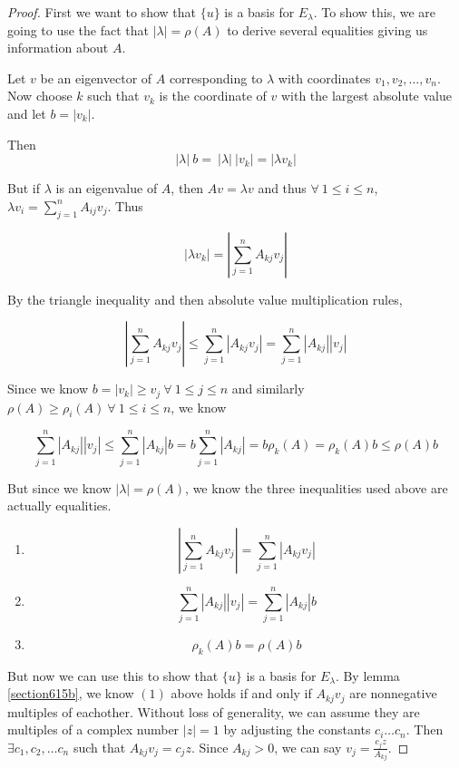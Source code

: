 \documentclass{amsart}
\theoremstyle{definition}
\theoremstyle{remark}
\numberwithin{equation}{section}
\begin{document}
\begin{proof}

First we want to show that $\{ u \}$ is a basis for $E_{\lambda}$.
To show this, we are going to use the fact that $|\lambda| = \rho(A)$ to derive several equalities giving us information about $A$.

Let $v$ be an eigenvector of $A$ corresponding to $\lambda$ with coordinates $v_1, v_2, \ldots, v_n$.  
Now choose $k$ such that $v_k$ is the coordinate of $v$ with the largest absolute value and let $b = |v_k|$.

Then $$ |\lambda|\ b =\ |\lambda|\ |v_k| = |\lambda v_k| $$

But if $\lambda$ is an eigenvalue of $A$, then $Av = \lambda v$ and thus $\forall\ 1 \leq i \leq n$, $\lambda v_i = \sum_{j = 1}^n A_{ij}v_j$.
Thus

$$ |\lambda v_k| = | \sum_{j = 1}^n A_{kj}v_j | $$

By the triangle inequality and then absolute value multiplication rules,

$$ | \sum_{j = 1}^n A_{kj}v_j | \leq \sum_{j=1}^n |A_{kj}v_j| = \sum_{j=1}^n |A_{kj}| |v_j| $$

Since we know $b = |v_k| \geq v_j\ \forall\ 1 \leq j \leq n$ and similarly $\rho(A) \geq  \rho_i(A)\ \forall\ 1 \leq i \leq n $, we know 

$$ \sum_{j=1}^n |A_{kj}| |v_j|  \leq \sum_{j=1}^n |A_{kj}| b = b \sum_{j=1}^n |A_{kj}| =  b\rho_k(A) = \rho_k(A)b \leq \rho(A)b $$


But since we know $|\lambda| = \rho(A)$, we know the three inequalities used above are actually equalities.

\begin{enumerate}

	\item $$| \sum_{j = 1}^n A_{kj}v_j | = \sum_{j=1}^n |A_{kj}v_j|$$

	\item $$\sum_{j=1}^n |A_{kj}| |v_j|  = \sum_{j=1}^n |A_{kj}| b$$

	\item $$\rho_k(A)b = \rho(A)b$$ \newline

\end{enumerate}


But now we can use this to show that $\{ u \}$ is a basis for $E_{\lambda}$.
By lemma \ref{section615b}, we know $(1)$ above holds if and only if $A_{kj}v_j$ are nonnegative multiples of eachother.
Without loss of generality, we can assume they are multiples of a complex number $|z| = 1$ by adjusting the constants $c_i \ldots c_n$.
Then $\exists c_1, c_2, \ldots c_n$ such that $A_{kj}v_j = c_j z$.
Since $A_{kj} > 0$, we can say $v_j = \frac{c_jz}{A_{kj}}$.


\end{proof}
\end{document}
